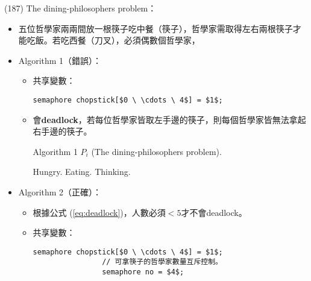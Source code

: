 \begin{theorem}{(187)} The dining-philosophers problem：\begin{itemize}
        \item 五位哲學家兩兩間放一根筷子吃中餐（筷子），哲學家需取得左右兩根筷子才能吃飯。若吃西餐（刀叉），必須偶數個哲學家，
        \item Algorithm 1（錯誤）：\begin{itemize}
            \item 共享變數：\begin{lstlisting}[caption={Shared variables of The dining-philosophers problem.}, captionpos=b, mathescape=true]
                semaphore chopstick[$0 \ \cdots \ 4$] = $1$;
            \end{lstlisting}
            \item 會\textbf{deadlock}，若每位哲學家皆取左手邊的筷子，則每個哲學家皆無法拿起右手邊的筷子。
            \begin{algorithm}[H]
                \caption{Algorithm 1 $P_i$ (The dining-philosophers problem).}
                \label{algo:din-philo-algo-1}
                \begin{algorithmic}[1]
                        \Repeat
                            \State Hungry.
                            \State {}
                            \State {}
                            \State Eating.
                            \State {}
                            \State {}
                            \State Thinking.
                    \EndFunction
                \end{algorithmic}
            \end{algorithm}
        \end{itemize}
        \item Algorithm 2（正確）：\begin{itemize}
            \item 根據公式 (\ref{eq:deadlock})，人數必須$< 5$才不會deadlock。
            \item 共享變數：\begin{lstlisting}[caption={Shared variables of The dining-philosophers problem.}, captionpos=b, mathescape=true]
                semaphore chopstick[$0 \ \cdots \ 4$] = $1$;
                // 可拿筷子的哲學家數量互斥控制。
                semaphore no = $4$; 

\end{lstlisting}
\end{itemize}
\end{itemize}
\end{theorem}
